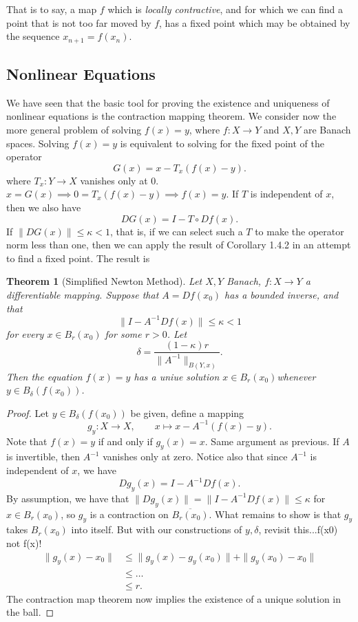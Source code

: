 \documentclass[letterpaper,twoside,12pt]{article}
\theoremstyle{mystyle}
\newtheorem{theorem}{Theorem}[section]
\newcommand{\cg}{\color{gray}}
\newcommand{\cbk}{\color{black}}
\newcommand{\cred}{\color{red}}
\newcommand{\inv}{^{-1}}
\begin{document}
  That is to say, a map \(f\) which is \textit{locally contractive}, and for which we can find a point that is not too far moved by \(f\), has a fixed point which may be obtained by the sequence \(x_{n+1} = f(x_n)\). 








\subsection{Nonlinear Equations}
  We have seen that the basic tool for proving the existence and uniqueness of nonlinear equations is the contraction mapping theorem. We consider now the more general problem of solving \(f(x) = y\), where $f:X\to Y$ and \(X, Y\) are Banach spaces. 
  Solving \(f(x) = y\) is equivalent to solving for the fixed point of the operator 
  \[G(x) = x - T_x(f(x) - y).\]
  where \(T_x : Y \to X\) vanishes only at $0$.
  \cg \(x = G(x) \implies 0 = T_x(f(x) - y)\implies f(x) =y. \)\cbk 
  If \(T\) is independent of \(x\), then we also have 
  \[DG(x) = I - T\circ Df(x).\]
  If $\|DG(x)\|\leq \kappa < 1$, that is, if we can select such a $T$ to make the operator norm less than one, then we can apply the result of Corollary 1.4.2 in an attempt to find a fixed point. The result is 
  \begin{tcolorbox}[colback=red!5!white,colframe=red!75!black]
    \begin{theorem}[Simplified Newton Method]
      Let \(X, Y\) Banach, \(f:X\to Y\) a differentiable mapping. Suppose that \(A=Df(x_0)\) has a bounded inverse, and that 
      \[\|I-A\inv Df(x)\| \leq \kappa <1\]
      for every $x \in B_r(x_0)$ for some $r>0$. Let 
      \[\delta = \frac{(1-\kappa)r}{\|A\inv\|_{B(Y,x)}}.\]
      Then the equation $f(x) = y$ has a uniue solution \(x\in B_r(x_0)\)whenever \(y\in B_{\delta}(f(x_0))\).
    \end{theorem}
  \end{tcolorbox}
  \begin{proof}
    Let \(y\in B_{\delta}(f(x_0))\) be given, define a mapping 
    \[g_y:X \to X, \qquad x \longmapsto x - A\inv(f(x)-y).\]
    Note that $f(x) = y$ if and only if $g_y(x) = x$. \cg Same argument as previous. If $A$ is invertible, then $A\inv$ vanishes only at zero. \cbk Notice also that since $A\inv$ is independent of \(x\), we have 
    \[Dg_y(x) = I - A\inv Df(x).\]
    By assumption, we have that $\|Dg_y(x)\| = \|I - A\inv Df(x)\| \leq \kappa$ for $x \in B_r(x_0)$, so \(g_y\) is a contraction on \(\overline{B_r(x_0)}\). What remains to show is that $g_y$ takes $B_r(x_0)$ into itself. But with our constructions of $y, \delta$, \cred revisit this...f(x0) not f(x)! 
    \begin{align*}
      \|g_y(x) - x_0\| &\leq \|g_y(x) - g_y(x_0)\| + \|g_y(x_0) - x_0\| \\
      &\leq \dots \\
      &\leq r.
    \end{align*} \cbk 
    The contraction map theorem now implies the existence of a unique solution in the ball. 
  \end{proof}
\end{document}
